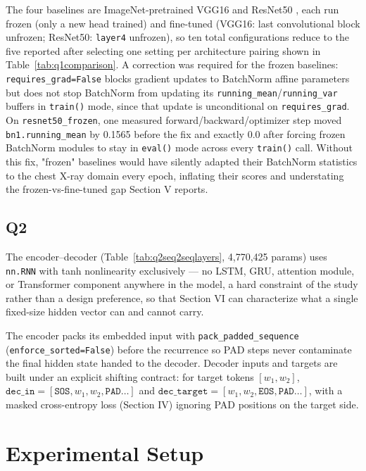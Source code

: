 \documentclass[conference]{IEEEtran}
\begin{document}
The four baselines are ImageNet-pretrained VGG16 \cite{simonyan2015vgg}
and ResNet50 \cite{he2016resnet}, each run frozen (only a new head
trained) and fine-tuned (VGG16: last convolutional block unfrozen;
ResNet50: \texttt{layer4} unfrozen), so ten total configurations
reduce to the five reported after selecting one setting per
architecture pairing shown in Table~\ref{tab:q1comparison}. A
correction was required for the frozen baselines:
\texttt{requires\_grad=False} blocks gradient updates to BatchNorm
affine parameters but does not stop BatchNorm from updating its
\texttt{running\_mean}/\texttt{running\_var} buffers in \texttt{train()}
mode, since that update is unconditional on \texttt{requires\_grad}. On
\texttt{resnet50\_frozen}, one measured forward/backward/optimizer step
moved \texttt{bn1.running\_mean} by 0.1565 before the fix and exactly
0.0 after forcing frozen BatchNorm modules to stay in \texttt{eval()}
mode across every \texttt{train()} call. Without this fix, "frozen"
baselines would have silently adapted their BatchNorm statistics to the
chest X-ray domain every epoch, inflating their scores and
understating the frozen-vs-fine-tuned gap Section V reports.

\subsection{Q2}
The encoder--decoder \cite{sutskever2014seq2seq}
(Table~\ref{tab:q2seq2seqlayers}, 4,770,425 params) uses
\texttt{nn.RNN} with tanh nonlinearity exclusively --- no LSTM, GRU,
attention module, or Transformer component anywhere in the model, a
hard constraint of the study rather than a design preference, so that
Section VI can characterize what a single fixed-size hidden vector can
and cannot carry.



The encoder packs its embedded input with
\texttt{pack\_padded\_sequence} (\texttt{enforce\_sorted=False}) before
the recurrence so PAD steps never contaminate the final hidden state
handed to the decoder. Decoder inputs and targets are built under an
explicit shifting contract: for target tokens $[w_1, w_2]$,
$\texttt{dec\_in} = [\texttt{SOS}, w_1, w_2, \texttt{PAD}\ldots]$ and
$\texttt{dec\_target} = [w_1, w_2, \texttt{EOS}, \texttt{PAD}\ldots]$,
with a masked cross-entropy loss (Section IV) ignoring PAD positions on
the target side.

\section{Experimental Setup}
\end{document}
